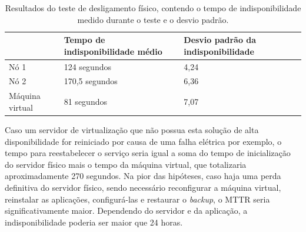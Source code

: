 
\begin{table}[h!]
\caption{Resultados do teste de desligamento físico, contendo o tempo de indisponibilidade medido durante o teste e o desvio padrão.}
\label{tab:teste1resultados}
\begin{center}
\begin{tabular}{|l|l|l|}\hline
 & \textbf{Tempo de indisponibilidade médio} & \textbf{Desvio padrão da indisponibilidade} \\\hline
Nó 1 & 124 segundos & 4,24 \\\hline
Nó 2 & 170,5 segundos & 6,36 \\\hline
Máquina virtual & 81 segundos & 7,07 \\\hline
\end{tabular}
\end{center}
\end{table}

Caso um servidor de virtualização que não possua esta solução de alta disponibilidade for reiniciado por causa de uma falha elétrica por exemplo,
o tempo para reestabelecer o serviço seria igual a soma do tempo de inicialização do servidor físico mais o tempo da máquina virtual, 
que totalizaria aproximadamente 270 segundos. 
Na pior das hipóteses, caso haja uma perda definitiva do servidor físico, sendo necessário reconfigurar a máquina virtual, reinstalar as aplicações,
configurá-las e restaurar o \textit{backup}, o \ac{MTTR} seria significativamente maior. Dependendo do servidor e da aplicação, 
a indisponibilidade poderia ser maior que 24 horas.


% 


